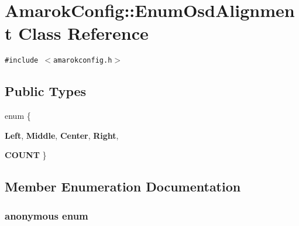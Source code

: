 \section{Amarok\-Config::Enum\-Osd\-Alignment Class Reference}
\label{classAmarokConfig_1_1EnumOsdAlignment}
{\tt \#include $<$amarokconfig.h$>$}

\subsection*{Public Types}
\begin{CompactItemize}
\item 
enum \{ \par
{\bf Left}, 
{\bf Middle}, 
{\bf Center}, 
{\bf Right}, 
\par
{\bf COUNT}
 \}
\end{CompactItemize}


\subsection{Member Enumeration Documentation}
\subsubsection{\setlength{\rightskip}{0pt plus 5cm}anonymous enum}\label{classAmarokConfig_1_1EnumOsdAlignment_AmarokConfig_1_1EnumOsdAlignmentw5}


